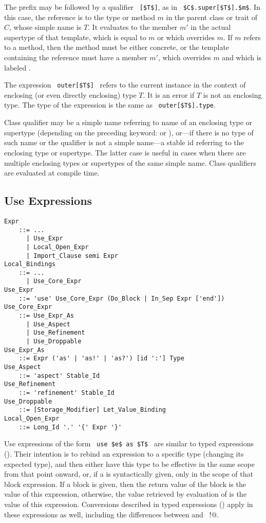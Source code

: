 The  prefix may be followed by a qualifier ~\lstinline![$T$]!, as in ~\lstinline!$C$.super[$T$].$m$!. In this case, the reference is to the type or method $m$ in the parent class or trait of $C$, whose simple name is $T$. It evaluates to the member $m'$ in the actual supertype of that template, which is equal to $m$ or which overrides $m$. If $m$ refers to a method, then the method must be either concrete, or the template containing the reference must have a member $m'$, which overrides $m$ and which is labeled . 

The expression ~\lstinline!outer[$T$]!~ refers to the current instance in the context of enclosing (or even directly enclosing) type $T$. It is an error if $T$ is not an enclosing type. The type of the expression is the same as ~\lstinline!outer[$T$].type!. 

Class qualifier may be a simple name referring to name of an enclosing type or supertype (depending on the preceding keyword:  or ), or---if there is no type of such name or the qualifier is not a simple name---a stable id referring to the enclosing type or supertype. The latter case is useful in cases when there are multiple enclosing types or supertypes of the same simple name. Class qualifiers are evaluated at compile time. 





\subsection{Use Expressions}
\label{sec:use-expressions}

\grammar\begin{lstlisting}
Expr
    ::= ...
      | Use_Expr
      | Local_Open_Expr
      | Import_Clause semi Expr
Local_Bindings
    ::= ...
      | Use_Core_Expr
Use_Expr 
    ::= 'use' Use_Core_Expr (Do_Block | In_Sep Expr ['end'])
Use_Core_Expr
    ::= Use_Expr_As
      | Use_Aspect
      | Use_Refinement
      | Use_Droppable
Use_Expr_As 
    ::= Expr ('as' | 'as!' | 'as?') [id ':'] Type
Use_Aspect
    ::= 'aspect' Stable_Id
Use_Refinement 
    ::= 'refinement' Stable_Id
Use_Droppable 
    ::= [Storage_Modifier] Let_Value_Binding
Local_Open_Expr
    ::= Long_Id '.' '{' Expr '}'
\end{lstlisting}

Use expressions of the form ~\lstinline!use $e$ as $T$!~ are similar to typed expressions (). Their intention is to rebind an expression to a specific type (changing its expected type), and then either have this type to be effective in the same scope from that point onward, or, if a  is syntactically given, only in the scope of that block expression. If a block is given, then the return value of the block is the value of this expression, otherwise, the value retrieved by evaluation of  is the value of this expression. Conversions described in typed expressions () apply in these expressions as well, including the differences between  and ~\lstinline@as!@. 

